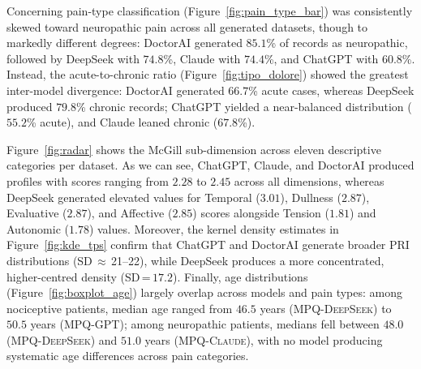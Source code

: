 \documentclass[preprint,12pt,authoryear]{elsarticle}
\newcommand{\dbGPT}{\small\textsc{MPQ-GPT}\xspace}
\newcommand{\dbClaude}{\small\textsc{MPQ-Claude}\xspace}
\newcommand{\dbDeepSeek}{\small\textsc{MPQ-DeepSeek}\xspace}
\begin{document}
Concerning pain-type classification (Figure~\ref{fig:pain_type_bar}) was consistently skewed toward neuropathic pain across all generated datasets, though to markedly different degrees: DoctorAI generated $85.1$\% of records as neuropathic, followed by DeepSeek with $74.8$\%, Claude with $74.4$\%, and ChatGPT with $60.8$\%. Instead, the acute-to-chronic ratio (Figure~\ref{fig:tipo_dolore}) showed the greatest inter-model divergence: DoctorAI generated $66.7$\% acute cases, whereas DeepSeek produced $79.8$\% chronic records; ChatGPT yielded a near-balanced distribution ($55.2$\% acute), and Claude leaned chronic ($67.8$\%).

Figure~\ref{fig:radar} shows the McGill sub-dimension across eleven descriptive categories per dataset. As we can see, ChatGPT, Claude, and DoctorAI produced profiles with scores ranging from $2.28$ to $2.45$ across all dimensions, whereas DeepSeek generated elevated values for Temporal ($3.01$), Dullness ($2.87$), Evaluative ($2.87$), and Affective ($2.85$) scores alongside Tension ($1.81$) and Autonomic ($1.78$) values.
Moreover, the kernel density estimates in Figure~\ref{fig:kde_tps} confirm that ChatGPT and DoctorAI generate broader PRI distributions (SD\,$\approx$\,21--22), while DeepSeek produces a more concentrated, higher-centred density (SD\,=\,$17.2$).
Finally, age distributions (Figure~\ref{fig:boxplot_age}) largely overlap across models and pain types: among nociceptive patients, median age ranged from $46.5$ years (\dbDeepSeek) to $50.5$ years (\dbGPT); among neuropathic patients, medians fell between $48.0$ (\dbDeepSeek) and $51.0$ years (\dbClaude), with no model producing systematic age differences across pain categories.
\end{document}
